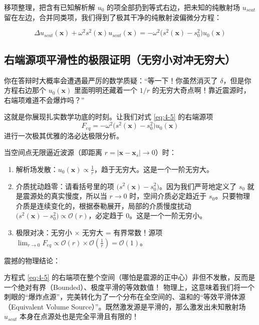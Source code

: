 \documentclass[12pt]{article}
\begin{document}
{移项整理，把含有已知解析解 $u_0$ 的项全部扔到等式右边，把未知的纯散射场 $u_{scat}$ 留在左边，合并同类项，我们得到了极其干净的纯散射波偏微分方程：

\begin{equation}
\Delta u_{scat}(\mathbf{x}) + \omega^2 s^2(\mathbf{x}) u_{scat}(\mathbf{x}) = -\omega^2 \big( s^2(\mathbf{x}) - s_0^2 \big) u_0(\mathbf{x})
\label{eq:4-5}
\end{equation}

\subsection{右端源项平滑性的极限证明（无穷小对冲无穷大）}

你在答辩时大概率会遭遇最严厉的数学质疑：“等一下！你虽然消灭了 $\delta$，但是你方程右边那个 $u_0(\mathbf{x})$ 里面明明还藏着一个 $1/r$ 的无穷大奇点啊！靠近震源时，右端项难道不会爆炸吗？”

这就是你展现扎实数学功底的时刻。让我们对式 \eqref{eq:4-5} 的右端源项
\[
F_{eq} = -\omega^2 \big( s^2(\mathbf{x}) - s_0^2 \big) u_0(\mathbf{x})
\]
进行一次极其优雅的洛必达极限分析。

当空间点无限逼近波源（即距离 $r = |\mathbf{x} - \mathbf{x}_s| \to 0$）时：

\begin{enumerate}[leftmargin=2em]
    \item 解析场发散：$u_0(\mathbf{x}) \propto \frac{1}{r}$，趋于无穷大。这是一个一阶无穷大。
    \item 介质扰动趋零：请看括号里的项 $\big( s^2(\mathbf{x}) - s_0^2 \big)$。因为我们严苛地定义了 $s_0$ 就是震源处的真实慢度，所以当 $r \to 0$ 时，空间介质必定趋近于 $s_0$。只要物理介质是连续变化的，根据泰勒展开，局部的介质慢度扰动 $\big( s^2(\mathbf{x}) - s_0^2 \big) \propto \mathcal{O}(r)$，必定趋于 0。这是一个一阶无穷小。
    \item 极限对决：无穷小 $\times$ 无穷大 = 有界常数！源项 $\lim_{r \to 0} F_{eq} \propto \mathcal{O}(r) \times \mathcal{O}\left(\frac{1}{r}\right) = \mathcal{O}(1)$。
\end{enumerate}

震撼的物理结论：

方程式 \eqref{eq:4-5} 的右端项在整个空间（哪怕是震源的正中心）非但不发散，反而是一个绝对有界（Bounded）、极度平滑的等效数值！
物理上，这意味着我们将一个刺眼的“爆炸点源”，完美转化为了一个分布在全空间的、温和的“等效平滑体源（Equivalent Volume Source）”。既然激发源是平滑的，那么激发出未知散射场 $u_{scat}$ 本身在点源处也是完全平滑且有限的！

}
\end{document}

